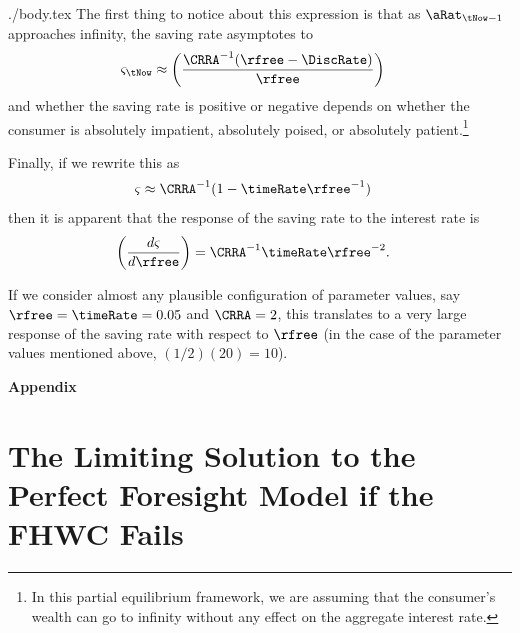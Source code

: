 \documentclass{handout}
\begin{document}
\begin{verbatimwrite}{./body.tex}
The first thing to notice about this expression is that as $\aRat_{\tNow-1}$ approaches infinity, the saving rate asymptotes to 
\begin{equation}\begin{gathered}\begin{aligned}
\varsigma_{\tNow} & \approx  \left(\frac{\CRRA^{-1}(\rfree-\DiscRate)}{\rfree}\right)
\end{aligned}\end{gathered}\end{equation}
and whether the saving rate is positive or negative depends on whether the consumer is absolutely impatient, absolutely poised, or absolutely patient.\footnote{In this partial equilibrium framework, we are assuming that the consumer's wealth can go to infinity without any effect on the aggregate interest rate.}

Finally, if we rewrite this as 
\begin{equation}\begin{gathered}\begin{aligned}
\varsigma & \approx  \CRRA^{-1} (1 - \timeRate \rfree^{-1})
\end{aligned}\end{gathered}\end{equation}
then it is apparent that the response of the saving rate to the interest rate is 
\begin{equation}\begin{gathered}\begin{aligned}
  \label{eq:dsdr}
  \left(\frac{d \varsigma}{d \rfree}\right) & =  \CRRA^{-1}\timeRate \rfree^{-2}.
\end{aligned}\end{gathered}\end{equation}

If we consider almost any plausible configuration of parameter values, say $\rfree = \timeRate=0.05$ and $\CRRA = 2$, this translates to a very large response of the saving rate with respect to $\rfree$ (in the case of the parameter values mentioned above, $(1/2)(20)=10$).  

\pagebreak\appendix
\centerline{\bf \LARGE Appendix}\medskip

\setcounter{section}{0}

\section{The Limiting Solution to the Perfect Foresight Model if the FHWC Fails}\label{sec:PFwhenFHWfails}


\end{verbatimwrite}
\end{document}
